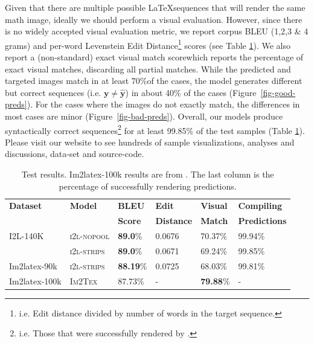 \documentclass{article}
\begin{document}
Given that there are multiple possible \LaTeX sequences that will render the same math image, ideally we should perform a visual evaluation. However, since there is no widely accepted visual evaluation metric, we report corpus BLEU (1,2,3 \& 4 grams) and per-word Levenstein Edit Distance\footnote{i.e. Edit distance divided by number of words in the target sequence.} scores (see Table \ref{table-scores}). We also report a (non-standard) exact visual match score\footnotemark[103] which reports the percentage of exact visual matches, discarding all partial matches. While the predicted and targeted images match in at least 70\%\footnotemark[103] of the cases, the model generates different but correct sequences (i.e. $\boldsymbol{y} \neq \boldsymbol{\hat{y}}$) in about 40\% of the cases (Figure~\ref{fig-good-preds}). For the cases where the images do not exactly match, the differences in most cases are minor (Figure~\ref{fig-bad-preds}). Overall, our models produce syntactically correct sequences\footnote{i.e. Those that were successfully rendered by \LaTeXe.} for at least 99.85\% of the test samples (Table \ref{table-scores}). Please visit our website to see hundreds of sample visualizations, analyses and discussions, data-set and source-code.
\begin{table}[!hbtp]
	\caption{Test results. Im2latex-100k results are from \citet{Deng2017ImagetoMarkupGW}. The last column is the percentage of successfully rendering predictions.}
	\begin{tabular}{llllll}
		\hline
		\textbf{Dataset} & \textbf{Model} & \textbf{BLEU}  & \textbf{Edit}     & \textbf{Visual} & \textbf{Compiling} \\
		&         & \textbf{Score} & \textbf{Distance} & \textbf{Match\footnotemark[103]} & \textbf{Predictions} \\
		\hline
		I2L-140K & \textsc{i2l-nopool} & \textbf{89.0}\% &  0.0676 & 70.37\% & 99.94\% \\
		& \textsc{i2l-strips} & \textbf{89.0}\% & 0.0671 & 69.24\%  & 99.85\% \\
		\hline
		Im2latex-90k & \textsc{i2l-strips} & \textbf{88.19}\%& 0.0725 & 68.03\%  & 99.81\% \\
		Im2latex-100k      & \textsc{Im2Tex}     & 87.73\%         & - & \textbf{79.88}\%  & - \\
		\hline
	\end{tabular}
	\centering
	\label{table-scores}
\end{table}
\end{document}
